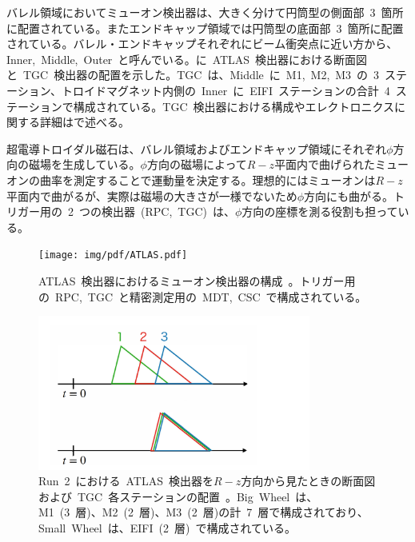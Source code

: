 バレル領域においてミューオン検出器は、大きく分けて円筒型の側面部~3~箇所に配置されている。またエンドキャップ領域では円筒型の底面部~3~箇所に配置されている。バレル・エンドキャップそれぞれにビーム衝突点に近い方から、Inner,~Middle,~Outer~と呼んでいる。に~ATLAS~検出器における断面図と~TGC~検出器の配置を示した。TGC~は、Middle~に~M1,~M2,~M3~の~3~ステーション、トロイドマグネット内側の~Inner~に~EIFI~ステーションの合計~4~ステーションで構成されている。TGC~検出器における構成やエレクトロニクスに関する詳細はで述べる。

超電導トロイダル磁石は、バレル領域およびエンドキャップ領域にそれぞれ$\phi$方向の磁場を生成している。$\phi$方向の磁場によって$R-z$平面内で曲げられたミューオンの曲率を測定することで運動量を決定する。理想的にはミューオンは$R-z$平面内で曲がるが、実際は磁場の大きさが一様でないため$\phi$方向にも曲がる。トリガー用の~2~つの検出器~(RPC,~TGC)~は、$\phi$方向の座標を測る役割も担っている。

\begin{figure}[H]
        \centering   
        \texttt{[image: img/pdf/ATLAS.pdf]}
        \caption[ATLAS~検出器におけるミューオン検出器の構成]{ATLAS~検出器におけるミューオン検出器の構成~\cite{TR:01}。トリガー用の~RPC,~TGC~と精密測定用の~MDT,~CSC~で構成されている。}\label{fig:mud}
\end{figure}

\begin{figure}[H]
    \centering
    \includegraphics[width=0.8\textwidth,page=7]{img/slide/slide.pdf}
    \caption[Run~2~における~ATLAS~検出器を$R-z$方向から見たときの断面図および~TGC~各ステーションの配置]{Run~2~における~ATLAS~検出器を$R-z$方向から見たときの断面図および~TGC~各ステーションの配置~\cite{TR:01}。Big~Wheel~は、M1~(3~層)、M2~(2~層)、M3~(2~層)の計~7~層で構成されており、Small~Wheel~は、EIFI~(2~層)~で構成されている。}\label{fig:tgc000}
\end{figure}

